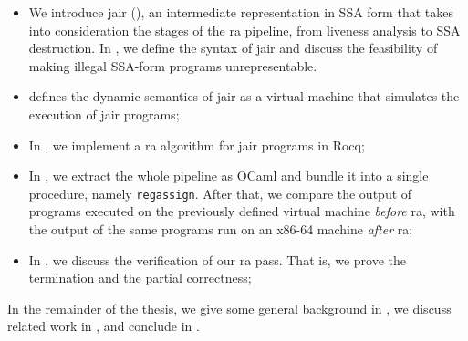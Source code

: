\begin{itemize}
    \item We introduce \gls{jair} (), an intermediate representation in SSA form that takes into consideration the stages of the \gls{ra} pipeline, from liveness analysis to SSA destruction. In , we define the syntax of \gls{jair} and discuss the feasibility of making illegal SSA-form programs unrepresentable.

    \item {} defines the dynamic semantics of \gls{jair} as a virtual machine that simulates the execution of \gls{jair} programs;

    \item In , we implement a \gls{ra} algorithm for \gls{jair} programs in Rocq;

    \item In , we extract the whole pipeline as OCaml and bundle it into a single procedure, namely \texttt{regassign}. After that, we compare the output of programs executed on the previously defined virtual machine \textit{before} \gls{ra}, with the output of the same programs run on an x86-64 machine \textit{after} \gls{ra};

    \item In , we discuss the verification of our \gls{ra} pass. That is, we prove the termination and the partial correctness;
\end{itemize}

In the remainder of the thesis, we give some general background in , we discuss related work in , and conclude in .

